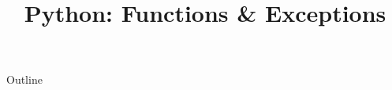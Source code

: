 \documentclass[xcolor=dvipsnames,compress,t,pdf]{beamer}
\title[\insertframenumber /\inserttotalframenumber]{Python: Functions \& Exceptions}
\begin{document}
	\begin{frame}
	\titlepage
	\end{frame}

	\begin{frame}{Outline}
	    \tableofcontents
	\end{frame}

	
	
	
\end{document}
